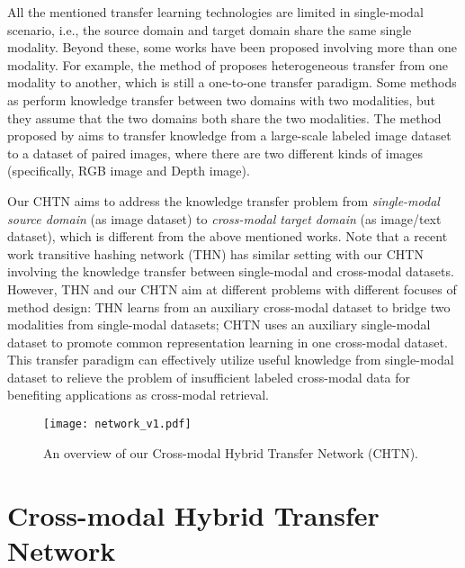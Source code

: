 \documentclass{article}
\begin{document}
All the mentioned transfer learning technologies are limited in single-modal scenario, i.e., the source domain and target domain share the same single modality.
Beyond these, some works have been proposed involving more than one modality. For example, the method of \cite{DBLP:conf/cvpr/TsaiYW16} proposes heterogeneous transfer from one modality to another, which is still a one-to-one transfer paradigm. Some methods as \cite{DBLP:journals/tmm/YangZX15} perform knowledge transfer between two domains with two modalities, but they assume that the two domains both share the two modalities. 
The method proposed by \cite{DBLP:conf/cvpr/GuptaHM16} aims to transfer knowledge from a large-scale labeled image dataset to a dataset of paired images, where there are two different kinds of images (specifically, RGB image and Depth image). 

Our CHTN aims to address the knowledge transfer problem from \emph{single-modal source domain} (as image dataset) to \emph{cross-modal target domain} (as image/text dataset), which is different from the above mentioned works. Note that a recent work transitive hashing network (THN) \cite{DBLP:journals/corr/CaoL016a} has similar setting with our CHTN involving the knowledge transfer between single-modal and cross-modal datasets. However, THN and our CHTN aim at different problems with different focuses of method design: THN learns from an auxiliary cross-modal dataset to bridge two modalities from single-modal datasets; CHTN uses an auxiliary single-modal dataset to promote common representation learning in one cross-modal dataset.
This transfer paradigm can effectively utilize useful knowledge from single-modal dataset to relieve the problem of insufficient labeled cross-modal data for benefiting applications as cross-modal retrieval.


\begin{figure*}[t]
  \centering
\begin{minipage}[c]{\linewidth}
\centering
  \texttt{[image: network\_v1.pdf]}
\end{minipage}%
\caption{An overview of our Cross-modal Hybrid Transfer Network (CHTN).}\label{fig:network}
\end{figure*}


\section{Cross-modal Hybrid Transfer Network}
\end{document}
